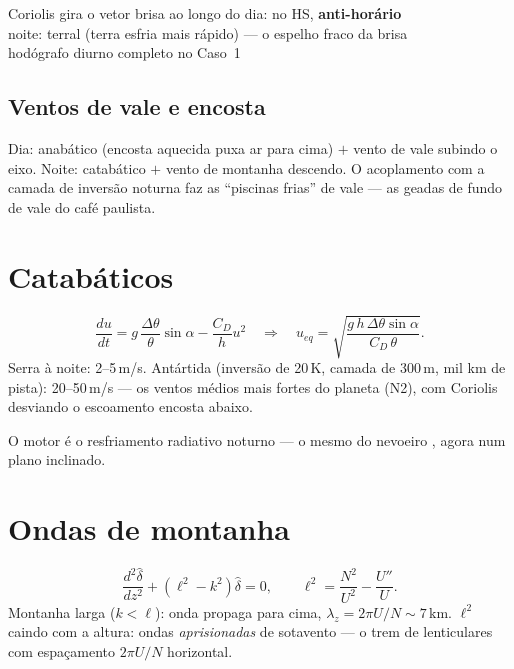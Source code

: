 \documentclass[11pt]{article}
\begin{document}
\begin{noquadro}
Coriolis gira o vetor brisa ao longo do dia: no HS,
\textbf{anti-horário}\\
noite: terral (terra esfria mais rápido) — o espelho fraco da brisa\\
hodógrafo diurno completo no Caso~1
\end{noquadro}

\subsection{Ventos de vale e encosta}

Dia: anabático (encosta aquecida puxa ar para cima) $+$ vento de vale
subindo o eixo. Noite: catabático $+$ vento de montanha descendo. O
acoplamento com a camada de inversão noturna
 faz as ``piscinas frias'' de vale — as geadas
de fundo de vale do café paulista.

\section{Catabáticos}\label{sec:cat}

\begin{formadif}
\[ \frac{du}{dt} = g\,\frac{\Delta\theta}{\theta}\sin\alpha
- \frac{C_D}{h}u^2
\quad\Rightarrow\quad
u_{eq} = \sqrt{\frac{g\,h\,\Delta\theta\sin\alpha}{C_D\,\theta}}. \]
Serra à noite: 2--5\,m/s. Antártida (inversão de 20\,K, camada de
300\,m, mil km de pista): 20--50\,m/s — os ventos médios mais fortes
do planeta (N2), com Coriolis desviando o escoamento encosta abaixo.
\end{formadif}

O motor é o resfriamento radiativo noturno
 — o mesmo do nevoeiro
, agora num plano inclinado.

\section{Ondas de montanha}\label{sec:ondas}


\begin{formadif}
\[ \frac{d^2\hat\delta}{dz^2} + (\ell^2 - k^2)\hat\delta = 0,
\qquad \ell^2 = \frac{N^2}{U^2} - \frac{U''}{U}. \]
Montanha larga ($k<\ell$): onda propaga para cima,
$\lambda_z = 2\pi U/N \sim 7$\,km. $\ell^2$ caindo com a altura:
ondas \emph{aprisionadas} de sotavento — o trem de lenticulares
 com espaçamento $2\pi U/N$ horizontal.
\end{formadif}
\end{document}
